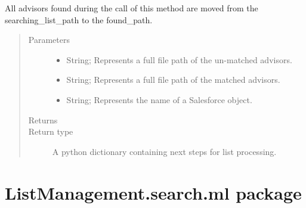 \documentclass[letterpaper,10pt,english]{sphinxmanual}
\begin{document}
\begin{fulllineitems}
\begin{fulllineitems}
All advisors found during the call of this method are moved from the searching\_list\_path
to the found\_path.
\begin{quote}\begin{description}
\item[{Parameters}] \leavevmode\begin{itemize}
\item {} 
 \textendash{} String; Represents a full file path of the un-matched advisors.

\item {} 
 \textendash{} String; Represents a full file path of the matched advisors.

\item {} 
 \textendash{} String; Represents the name of a Salesforce object.

\end{itemize}

\item[{Returns}] \leavevmode


\item[{Return type}] \leavevmode
A python dictionary containing next steps for list processing.

\end{description}\end{quote}

\end{fulllineitems}


\begin{fulllineitems}
\label{\detokenize{index:ListManagement.search.salesforce.Search.perform_sec_search}}
\end{fulllineitems}


\end{fulllineitems}



\chapter{ListManagement.search.ml package}
\label{\detokenize{index:module-ListManagement.search.ml}}\label{\detokenize{index:listmanagement-search-ml-package}}\label{\detokenize{index:module-ListManagement.search.ml.header_predictions}}
\end{document}
